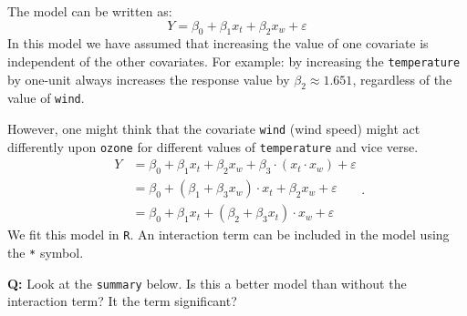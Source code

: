 \documentclass[ignorenonframetext,]{beamer}
\begin{document}
\begin{frame}[fragile]

The model can be written as:
\[Y = \beta_0 + \beta_1 x_t + \beta_2 x_w + \varepsilon\] In this model
we have assumed that increasing the value of one covariate is
independent of the other covariates. For example: by increasing the
\texttt{temperature} by one-unit always increases the response value by
\(\beta_2 \approx 1.651\), regardless of the value of \texttt{wind}.

\end{frame}

\begin{frame}[fragile]

However, one might think that the covariate \texttt{wind} (wind speed)
might act differently upon \texttt{ozone} for different values of
\texttt{temperature} and vice verse.
\[\begin{aligned} Y &= \beta_0 +  \beta_1 x_t + \beta_2 x_w + \beta_3\cdot(x_t  \cdot x_w) +\varepsilon \\ &= \beta_0 +  (\beta_1 + \beta_3 x_w) \cdot x_t + \beta_2 x_w + \varepsilon \\ &= \beta_0 + \beta_1 x_t + (\beta_2 + \beta_3 x_t) \cdot x_w + \varepsilon \end{aligned}.\]
We fit this model in \texttt{R}. An interaction term can be included in
the model using the \texttt{*} symbol.

\textbf{Q:} Look at the \texttt{summary} below. Is this a better model
than without the interaction term? It the term significant?

\end{frame}
\end{document}
